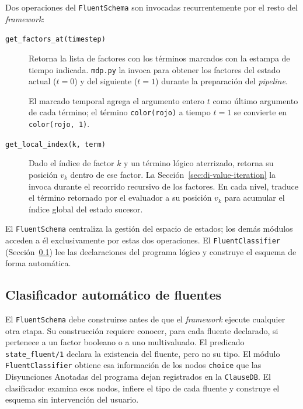 Dos operaciones del \texttt{FluentSchema} son invocadas recurrentemente por el
resto del \textit{framework}:

\begin{description}
    \item[\texttt{get\_factors\_at(timestep)}] Retorna la lista de factores con los
        términos marcados con la estampa de tiempo indicada. \texttt{mdp.py} la
        invoca para obtener los factores del estado actual ($t = 0$) y del
        siguiente ($t = 1$) durante la preparación del \textit{pipeline}.

        El marcado temporal agrega el argumento entero $t$ como último argumento
        de cada término; el término \texttt{color(rojo)} a tiempo $t = 1$ se
        convierte en \texttt{color(rojo, 1)}.

    \item[\texttt{get\_local\_index(k, term)}] Dado el índice de factor $k$ y un
        término lógico aterrizado, retorna su posición $v_k$ dentro de ese factor.
        La Sección~\ref{sec:di-value-iteration} la invoca durante el recorrido
        recursivo de los factores. En cada nivel, traduce el término retornado
        por el evaluador a su posición $v_k$ para acumular el índice global del
        estado sucesor.
\end{description}

El \texttt{FluentSchema} centraliza la gestión del espacio de estados; los demás
módulos acceden a él exclusivamente por estas dos operaciones. El
\texttt{FluentClassifier} (Sección~\ref{sec:di-fluentclassifier}) lee las
declaraciones del programa lógico y construye el esquema de forma automática.


\subsection{Clasificador automático de fluentes}
\label{sec:di-fluentclassifier}

El \texttt{FluentSchema} debe construirse antes de que el \textit{framework}
ejecute cualquier otra etapa. Su construcción requiere conocer, para cada fluente
declarado, si pertenece a un factor booleano o a uno multivaluado. El predicado
\texttt{state\_fluent/1} declara la existencia del fluente, pero no su tipo. El
módulo \texttt{FluentClassifier} obtiene esa información de los nodos
\texttt{choice} que las Disyunciones Anotadas del programa dejan registrados en
la \texttt{ClauseDB}. El clasificador examina esos nodos, infiere el tipo de cada
fluente y construye el esquema sin intervención del usuario.

